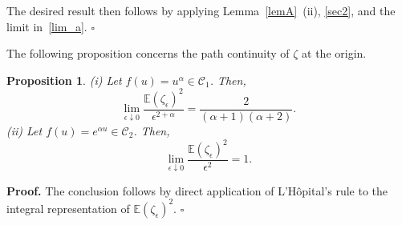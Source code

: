 \documentclass[preprint,12pt,authoryear]{elsarticle}
\def\E{\mathbb{E}}
\newtheorem{prop}{Proposition}
\begin{document}
The desired result then follows by applying Lemma~\ref{lemA}~(ii), \eqref{sec2}, and the limit in~\eqref{lim_a}. \hfill\(\square\)


The following proposition concerns the path continuity of $\zeta$ at the origin.

\begin{prop}\label{propD} 
(i) Let \( f(u) = u^{\alpha} \in \mathcal{C}_1 \). Then,
\[
\lim_{\epsilon \downarrow 0} \frac{\E(\zeta_{\epsilon})^2}{\epsilon^{2+\alpha}} = \frac{2}{(\alpha+1)(\alpha+2)}.
\]
(ii) Let \( f(u) = e^{\alpha u} \in \mathcal{C}_2 \). Then,
\[
\lim_{\epsilon \downarrow 0} \frac{\E(\zeta_{\epsilon})^2}{\epsilon^{2}} = 1.
\]
\end{prop}
\noindent\textbf{Proof.} The conclusion follows by direct application of L’Hôpital’s rule to the integral representation of \(\E(\zeta_{\epsilon})^2\).
\hfill$\square$













\end{document}
